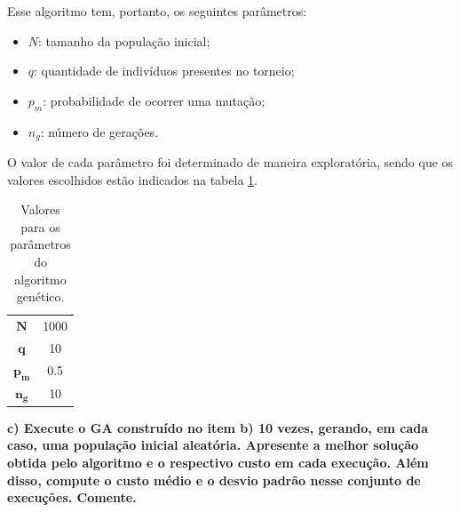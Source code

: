 \documentclass[a4paper, 12pt]{article}
\begin{document}
Esse algoritmo tem, portanto, os seguintes parâmetros:
\begin{itemize}
    \item $N$: tamanho da população inicial;
    \item $q$: quantidade de indivíduos presentes no torneio;
    \item $p_m$: probabilidade de ocorrer uma mutação;
    \item $n_g$: número de gerações.
\end{itemize}

O valor de cada parâmetro foi determinado de maneira exploratória, sendo que os valores escolhidos estão indicados na tabela \ref{tab:valores-parametros}.
\begin{table}[H]
    \centering
    \begin{tabular}{c c}
    \toprule
        $\bm{N}$ & 1000\\
        $\bm{q}$ & 10\\
        $\bm{p_m}$ & 0.5\\
        $\bm{n_g}$ & 10\\
    \bottomrule
    \end{tabular}
    \caption{Valores para os parâmetros do algoritmo genético.}
    \label{tab:valores-parametros}
\end{table}

\textbf{c) Execute o GA construído no item b) 10 vezes, gerando, em cada caso, uma população inicial aleatória. Apresente a melhor solução obtida pelo algoritmo e o respectivo custo em cada execução. Além disso, compute o custo médio e o desvio padrão nesse conjunto de execuções. Comente.}
\end{document}
